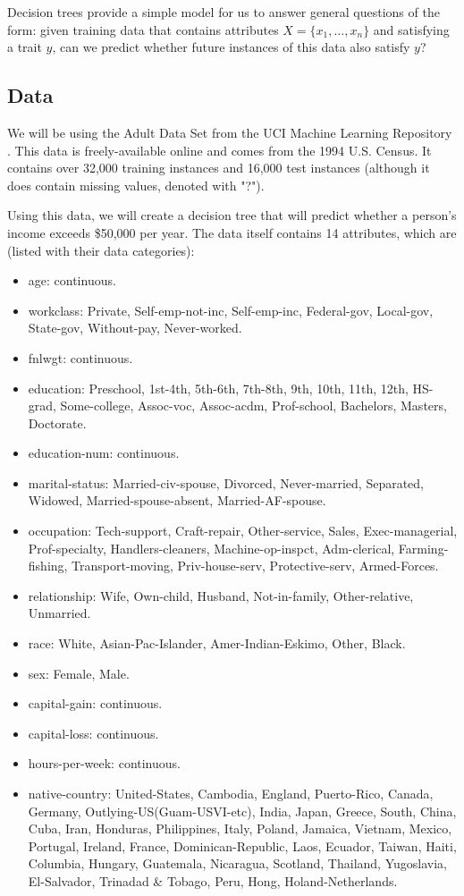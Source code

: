 \documentclass{article}
\begin{document}
Decision trees provide a simple model for us to answer general questions of the form: given training data that contains attributes $X = \{x_1, \ldots, x_n\}$ and satisfying a trait $y$, can we predict whether future instances of this data also satisfy $y$?


\subsection{Data}
We will be using the Adult Data Set from the UCI Machine Learning Repository \cite{bache-lichman}. This data is freely-available online and comes from the 1994 U.S. Census. It contains over 32,000 training instances and 16,000 test instances (although it does contain missing values, denoted with "?"). 

Using this data, we will create a decision tree that will predict whether a person's income exceeds \$50,000 per year. The data itself contains 14 attributes, which are (listed with their data categories):

\begin{itemize}
\item age: continuous. 
\item workclass: Private, Self-emp-not-inc, Self-emp-inc, Federal-gov, Local-gov, State-gov, Without-pay, Never-worked. 
\item fnlwgt: continuous. 
\item education: Preschool, 1st-4th, 5th-6th, 7th-8th, 9th, 10th, 11th, 12th,  HS-grad, Some-college, Assoc-voc, Assoc-acdm, Prof-school, Bachelors, Masters, Doctorate. 
\item education-num: continuous. 
\item marital-status: Married-civ-spouse, Divorced, Never-married, Separated, Widowed, Married-spouse-absent, Married-AF-spouse. 
\item occupation: Tech-support, Craft-repair, Other-service, Sales, Exec-managerial, Prof-specialty, Handlers-cleaners, Machine-op-inspct, Adm-clerical, Farming-fishing, Transport-moving, Priv-house-serv, Protective-serv, Armed-Forces. 
\item relationship: Wife, Own-child, Husband, Not-in-family, Other-relative, Unmarried. 
\item race: White, Asian-Pac-Islander, Amer-Indian-Eskimo, Other, Black. 
\item sex: Female, Male. 
\item capital-gain: continuous. 
\item capital-loss: continuous. 
\item hours-per-week: continuous. 
\item native-country: United-States, Cambodia, England, Puerto-Rico, Canada, Germany, Outlying-US(Guam-USVI-etc), India, Japan, Greece, South, China, Cuba, Iran, Honduras, Philippines, Italy, Poland, Jamaica, Vietnam, Mexico, Portugal, Ireland, France, Dominican-Republic, Laos, Ecuador, Taiwan, Haiti, Columbia, Hungary, Guatemala, Nicaragua, Scotland, Thailand, Yugoslavia, El-Salvador, Trinadad \& Tobago, Peru, Hong, Holand-Netherlands.
\end{itemize}
\end{document}
